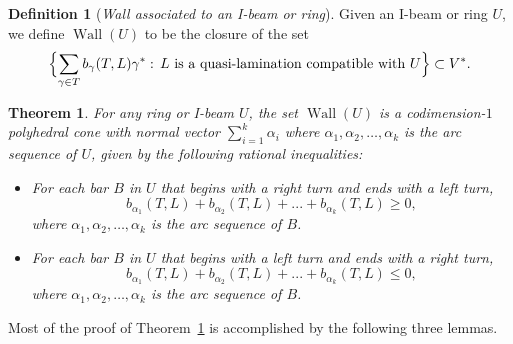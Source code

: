 \documentclass{amsart}
\newtheorem{theorem}[proposition]{Theorem}
\theoremstyle{definition}
\newtheorem{definition}[proposition]{Definition}
\theoremstyle{remark}
\numberwithin{equation}{section}
\newcommand{\settt}[1]{{\Bigl\lbrace #1 \Bigr\rbrace}}
\newcommand{\0}{{\mathbf{0}}}
\newcommand{\Wall}{\operatorname{Wall}}
\begin{document}
\begin{definition}[\emph{Wall associated to an I-beam or ring}]
Given an I-beam or ring $U$, we define $\Wall(U)$ to be the closure of the set
\[\settt{\sum_{\gamma\in T}b_\gamma(T,L)\gamma^*:\,L\text{ is a quasi-lamination compatible with }U}\subset V^*.\]
\end{definition}


\begin{theorem}\label{wall thm}
For any ring or I-beam $U$, the set $\Wall(U)$ is a codimension-$1$ polyhedral cone with normal vector $\sum_{i=1}^k\alpha_i$ where $\alpha_1, \alpha_2,\ldots,\alpha_k$ is the arc sequence of $U$, given by the following rational inequalities:
\begin{itemize}
\item For each bar $B$ in $U$ that begins with a right turn and ends with a left turn,
\[ b_{\alpha_1}(T,L) + b_{\alpha_2}(T,L) + ... + b_{\alpha_k}(T,L) \geq 0,\]
where $\alpha_1, \alpha_2,\ldots,\alpha_k$ is the arc sequence of $B$.
\item For each bar $B$ in $U$ that begins with a left turn and ends with a right turn,
\[ b_{\alpha_1}(T,L) + b_{\alpha_2}(T,L) + ... + b_{\alpha_k}(T,L) \leq 0,\]
where $\alpha_1, \alpha_2,\ldots,\alpha_k$ is the arc sequence of $B$.
\end{itemize}
\end{theorem}

Most of the proof of Theorem~\ref{wall thm} is accomplished by the following three lemmas.
\end{document}
